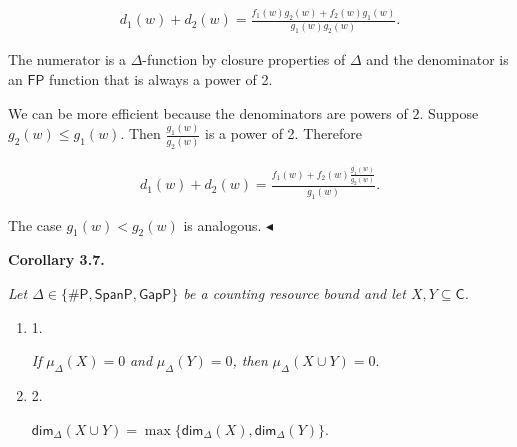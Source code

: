 \[\begin{gathered}
d_{1}(w)+d_{2}(w)=\frac{f_{1}(w)g_{2}(w)+f_{2}(w)g_{1}(w)}{g_{1}(w)g_{2}(w)}.
\end{gathered}\]


The numerator is a $\Delta$-function by closure properties of $\Delta$ and the denominator is an $\mathsf{FP}$
function that is always a power of 2.\par




We can be more efficient because the denominators are powers of $2$. Suppose $g_{2}(w)\leq g_{1}(w)$. Then $\frac{g_{1}(w)}{g_{2}(w)}$ is a power
of 2.
Therefore\par


\[\begin{gathered}
d_{1}(w)+d_{2}(w)=\frac{f_{1}(w)+f_{2}(w)\frac{g_{1}(w)}{g_{2}(w)}}{g_{1}(w)}.
\end{gathered}\]


The case $g_{1}(w)<g_{2}(w)$ is analogous.
$\blacktriangleleft$\par





\par\medskip\noindent\textbf{
\textbf{Corollary 3.7}\textbf{.}
}\par



\emph{Let $\Delta\in\{{\mathsf{\#}\mathsf{P}},\mathsf{SpanP},\mathsf{GapP}\}$ be a counting resource bound and let
$X,Y\subseteq\mathsf{C}$.}\par


\begin{enumerate}


\item[] 
1. 


\emph{If }$\mu_{\Delta}(X)=0$\emph{ and }$\mu_{\Delta}(Y)=0$\emph{, then }$\mu_{\Delta}(X\cup Y)=0.$\emph{}\par





\item[] 
2. 


${\mathsf{dim}}_{\Delta}(X\cup Y)=\max\{{\mathsf{dim}}_{\Delta}(X),{\mathsf{dim}}_{\Delta}(Y)\}.$\emph{}\par





\end{enumerate}



